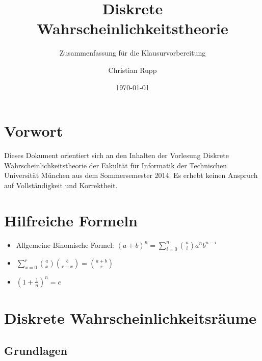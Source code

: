 \documentclass[a4,12pt]{scrartcl}
\title{Diskrete Wahrscheinlichkeitstheorie}
\subtitle{Zusammenfassung für die Klausurvorbereitung}
\author{Christian Rupp}
\date{\today}
\begin{document}
\maketitle

\newpage

\tableofcontents

\section{Vorwort}

Dieses Dokument orientiert sich an den Inhalten der Vorlesung Diskrete Wahrscheinlichkeitstheorie der Fakultät für Informatik der Technischen Universität München aus dem Sommersemester 2014.
Es erhebt keinen Anspruch auf Vollständigkeit und Korrektheit.

\section{Hilfreiche Formeln}

\begin{itemize}
\item Allgemeine Binomische Formel: $(a+b)^n=\sum^n_{i=0}\binom {n}{i}a^nb^{n-i}$
\item $\sum^r_{x=0}\binom{a}{x}\binom{b}{r-x}=\binom{a+b}{r}$
\item $\left(1+\frac{1}{n}\right)^n=e$
\end{itemize}

\section{Diskrete Wahrscheinlichkeitsräume}

\subsection{Grundlagen}
\end{document}
